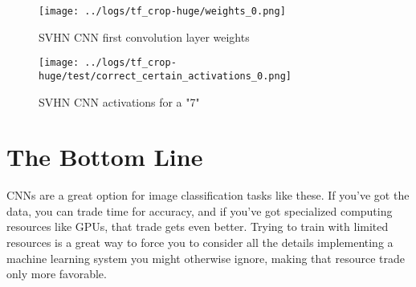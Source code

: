 \documentclass{article}
\begin{document}
\begin{figure}[htbp]
  \centering
  \texttt{[image: ../logs/tf\_crop-huge/weights\_0.png]}
  \caption{SVHN CNN first convolution layer weights}
  \label{fig:svhn_cnn_weights}
\end{figure}

\begin{figure}[htbp]
  \centering
  \texttt{[image: ../logs/tf\_crop-huge/test/correct\_certain\_activations\_0.png]}
  \caption{SVHN CNN activations for a "7"}
  \label{fig:svhn_cnn_activations}
\end{figure}

\section{The Bottom Line}

CNNs are a great option for image classification tasks like these. If you've got the data, you can trade time for accuracy, and if you've got specialized computing resources like GPUs, that trade gets even better. Trying to train with limited resources is a great way to force you to consider all the details implementing a machine learning system you might otherwise ignore, making that resource trade only more favorable.

\printbibliography[heading=bibintoc,title={References}]
\end{document}
